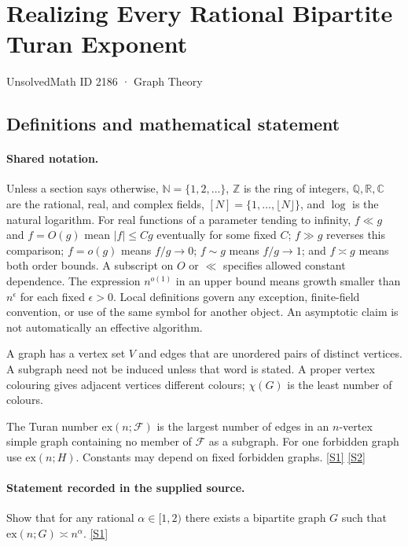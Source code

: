 \documentclass[11pt,a4paper]{article}
\newcommand{\N}{\mathbb{N}}
\newcommand{\Z}{\mathbb{Z}}
\newcommand{\Q}{\mathbb{Q}}
\newcommand{\R}{\mathbb{R}}
\newcommand{\C}{\mathbb{C}}
\newcommand{\sref}[2]{\hyperlink{source:#1:#2}{[S#2]}}
\begin{document}

\setcounter{section}{2185}

\section{Realizing Every Rational Bipartite Turan Exponent}\label{2186}

{\small\sffamily UnsolvedMath ID 2186 · Graph Theory}

\subsection{Definitions and mathematical statement}

\paragraph{Shared notation.}Unless a section says otherwise, $\N=\{1,2,\ldots\}$,
$\Z$ is the ring of integers, $\Q,\R,\C$ are the rational, real, and complex
fields, $[N]=\{1,\ldots,\lfloor N\rfloor\}$, and $\log$ is the natural
logarithm. For real functions of a parameter tending to infinity,
$f\ll g$ and $f=O(g)$ mean $|f|\leq Cg$ eventually for some fixed $C$;
$f\gg g$ reverses this comparison; $f=o(g)$ means $f/g\to0$;
$f\sim g$ means $f/g\to1$; and $f\asymp g$ means both order bounds.
A subscript on $O$ or $\ll$ specifies allowed constant dependence.
The expression $n^{o(1)}$ in an upper bound means growth smaller than
$n^\epsilon$ for each fixed $\epsilon>0$. Local definitions govern any
exception, finite-field convention, or use of the same symbol for another
object. An asymptotic claim is not automatically an effective algorithm.



A graph has a vertex set $V$ and edges that are unordered pairs of distinct vertices. A subgraph need not be induced unless that word is stated. A proper vertex colouring gives adjacent vertices different colours; $\chi(G)$ is the least number of colours.

The Turan number $\mathrm{ex}(n;\mathcal F)$ is the largest number of edges in an $n$-vertex simple graph containing no member of $\mathcal F$ as a subgraph. For one forbidden graph use $\mathrm{ex}(n;H)$. Constants may depend on fixed forbidden graphs. \sref{2186}{1} \sref{2186}{2}

\paragraph{Statement recorded in the supplied source.}
Show that for any rational $\alpha \in [1,2)$ there exists a bipartite graph $G$ such that $ \mathrm{ex}(n;G)\asymp n^{\alpha}. $ \sref{2186}{1}
\end{document}
